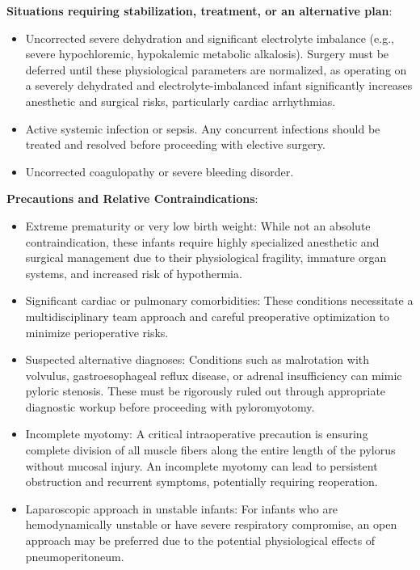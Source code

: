 \textbf{Situations requiring stabilization, treatment, or an alternative plan}:
\begin{itemize}
  \item Uncorrected severe dehydration and significant electrolyte imbalance (e.g., severe hypochloremic, hypokalemic metabolic alkalosis). Surgery must be deferred until these physiological parameters are normalized, as operating on a severely dehydrated and electrolyte-imbalanced infant significantly increases anesthetic and surgical risks, particularly cardiac arrhythmias.
  \item Active systemic infection or sepsis. Any concurrent infections should be treated and resolved before proceeding with elective surgery.
  \item Uncorrected coagulopathy or severe bleeding disorder.
\end{itemize}

\textbf{Precautions and Relative Contraindications}:
\begin{itemize}
  \item Extreme prematurity or very low birth weight: While not an absolute contraindication, these infants require highly specialized anesthetic and surgical management due to their physiological fragility, immature organ systems, and increased risk of hypothermia.
  \item Significant cardiac or pulmonary comorbidities: These conditions necessitate a multidisciplinary team approach and careful preoperative optimization to minimize perioperative risks.
  \item Suspected alternative diagnoses: Conditions such as malrotation with volvulus, gastroesophageal reflux disease, or adrenal insufficiency can mimic pyloric stenosis. These must be rigorously ruled out through appropriate diagnostic workup before proceeding with pyloromyotomy.
  \item Incomplete myotomy: A critical intraoperative precaution is ensuring complete division of all muscle fibers along the entire length of the pylorus without mucosal injury. An incomplete myotomy can lead to persistent obstruction and recurrent symptoms, potentially requiring reoperation.
  \item Laparoscopic approach in unstable infants: For infants who are hemodynamically unstable or have severe respiratory compromise, an open approach may be preferred due to the potential physiological effects of pneumoperitoneum.
\end{itemize}

